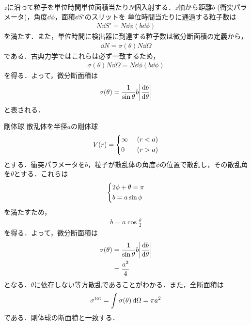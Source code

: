 \documentclass{report}
\begin{document}
$z$に沿って粒子を単位時間単位面積当たり$N$個入射する．$z$軸から距離$b$ (衝突パラメータ)，角度$\dd{\phi}$，面積$\dd{S'}$のスリットを
単位時間当たりに通過する粒子数は
\begin{align}
  N\dd{S'} = N \dd{\phi} (b \dd{\phi})
\end{align}
を満たす．また，単位時間に検出器に到達する粒子数は微分断面積の定義から，
\begin{align}
  \dd{N} = \sigma (\theta) N \dd{\Omega}
\end{align}
である．古典力学ではこれらは必ず一致するため，
\begin{align}
  \sigma (\theta) N \dd{\Omega} = N \dd{\phi} (b \dd{\phi})
\end{align}
を得る．よって，微分断面積は
\begin{align}
  \sigma(\theta) = \frac{1}{\sin \theta} b \abs{\frac{\dd{b}}{\dd{\theta}}}
\end{align}
と表される．
\begin{myex}{剛体球}{}
  散乱体を半径$a$の剛体球
  \begin{align}
    V(r) = 
    \begin{dcases}
      \infty\ &(r < a)\\
      0\ &(r>a)
    \end{dcases}
  \end{align}
  とする．衝突パラメータを$b$，粒子が散乱体の角度$\phi$の位置で散乱し，その散乱角を$\theta$とする．これらは
  \begin{align}
    \begin{dcases}
      2\phi + \theta = \pi\\
      b = a\sin \phi
    \end{dcases}
  \end{align}
  を満たすため，
  \begin{align}
    b = a\cos \frac{\theta}{2}
  \end{align}
  を得る．よって，微分断面積は
  \begin{align}
  \sigma(\theta) &= \frac{1}{\sin \theta} b \abs{\frac{\dd{b}}{\dd{\theta}}}\\
  &= \frac{a^2}{4}
  \end{align}
  となる．$\theta$に依存しない等方散乱であることがわかる．また，全断面積は
  \begin{align}
    \sigma^{\mathrm{tot}} = \int \sigma(\theta) \dd{\Omega} = \pi a^2
  \end{align}
  である．剛体球の断面積と一致する．
\end{myex}
\end{document}
